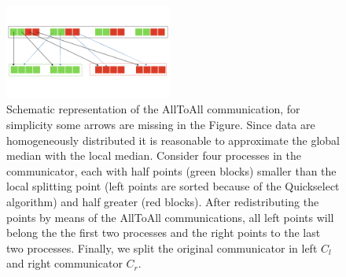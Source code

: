 \documentclass[amssymb, aps,nofootinbib, superscriptaddress, notitlepage]{revtex4}
\begin{document}
\begin{figure}
  \centering
      \includegraphics[width=0.49\textwidth]{img/all2all.png}
 \caption{Schematic representation of the AllToAll communication, for simplicity some arrows are missing in the Figure.
 Since data are homogeneously distributed it is reasonable to approximate the global median with the local median.
Consider four processes in the communicator, each with half points (green blocks) smaller than the local splitting point (left points are sorted because of the Quickselect algorithm) and half greater (red blocks). After redistributing the points by means of the AllToAll communications, all left points will belong the the first two processes and the right points to the last two processes. Finally, we split the original communicator in left  $C_l$ and  right communicator $C_r$.}
\label{all2all}
\end{figure}
\end{document}
